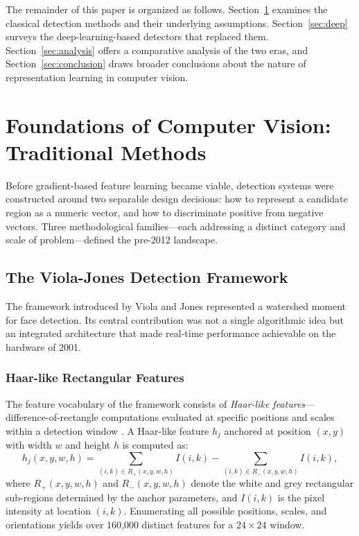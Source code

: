 \documentclass[conference]{IEEEtran}
\begin{document}
The remainder of this paper is organized as follows.
Section~\ref{sec:traditional} examines the classical detection
methods and their underlying assumptions.
Section~\ref{sec:deep} surveys the deep-learning-based detectors
that replaced them.
Section~\ref{sec:analysis} offers a comparative analysis of the
two eras, and Section~\ref{sec:conclusion} draws broader conclusions
about the nature of representation learning in computer vision.

\section{Foundations of Computer Vision:\\Traditional Methods}
\label{sec:traditional}

Before gradient-based feature learning became viable, detection
systems were constructed around two separable design decisions:
how to represent a candidate region as a numeric vector, and
how to discriminate positive from negative vectors.
Three methodological families---each addressing a distinct category
and scale of problem---defined the pre-2012 landscape.

\subsection{The Viola-Jones Detection Framework}
\label{subsec:vj}

The framework introduced by Viola and Jones
\cite{viola2001rapid,viola2004robust} represented a watershed
moment for face detection.
Its central contribution was not a single algorithmic idea but
an integrated architecture that made real-time performance
achievable on the hardware of 2001.

\subsubsection*{Haar-like Rectangular Features}

The feature vocabulary of the framework consists of
\emph{Haar-like features}---difference-of-rectangle computations
evaluated at specific positions and scales within a detection
window \cite{lienhart2002extended}.
A Haar-like feature $h_{j}$ anchored at position $(x, y)$ with
width $w$ and height $h$ is computed as:
\begin{equation}
  h_{j}(x,y,w,h) = \sum_{(i,k)\in R_{+}(x,y,w,h)} I(i,k)
                 - \sum_{(i,k)\in R_{-}(x,y,w,h)} I(i,k),
  \label{eq:haar}
\end{equation}
where $R_{+}(x,y,w,h)$ and $R_{-}(x,y,w,h)$ denote the white and
grey rectangular sub-regions determined by the anchor parameters,
and $I(i,k)$ is the pixel intensity at location $(i,k)$.
Enumerating all possible positions, scales, and orientations
yields over 160,000 distinct features for a $24 \times 24$ window.
\end{document}
